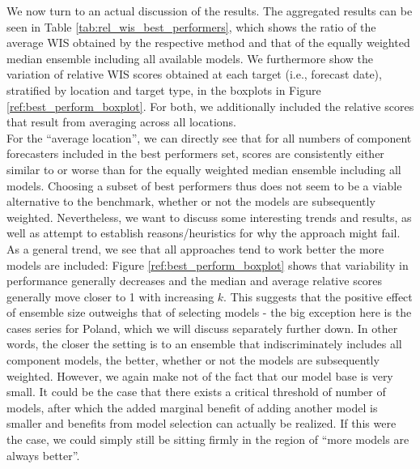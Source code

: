 We now turn to an actual discussion of the results. The aggregated results can be seen in Table \ref{tab:rel_wis_best_performers}, which shows the ratio of the average WIS obtained by the respective method and that of the equally weighted median ensemble including all available models. We furthermore show the variation of relative WIS scores obtained at each target (i.e., forecast date), stratified by location and target type, in the boxplots in Figure \ref{ref:best_perform_boxplot}. For both, we additionally included the relative scores that result from averaging across all locations.\\
For the ``average location'', we can directly see that for all numbers of component forecasters included in the best performers set, scores are consistently either similar to or worse than for the equally weighted median ensemble including all models. Choosing a subset of best performers thus does not seem to be a viable alternative to the benchmark, whether or not the models are subsequently weighted. Nevertheless, we want to discuss some interesting trends and results, as well as attempt to establish reasons/heuristics for why the approach might fail.\\
As a general trend, we see that all approaches tend to work better the more models are included: Figure \ref{ref:best_perform_boxplot} shows that variability in performance generally decreases and the median and average relative scores generally move closer to 1 with increasing $k$. This suggests that the positive effect of ensemble size outweighs that of selecting models - the big exception here is the cases series for Poland, which we will discuss separately further down. In other words, the closer the setting is to an ensemble that indiscriminately includes all component models, the better, whether or not the models are subsequently weighted. However, we again make not of the fact that our model base is very small. It could be the case that there exists a critical threshold of number of models, after which the added marginal benefit of adding another model is smaller and benefits from model selection can actually be realized. If this were the case, we could simply still be sitting firmly in the region of ``more models are always better''.\\
